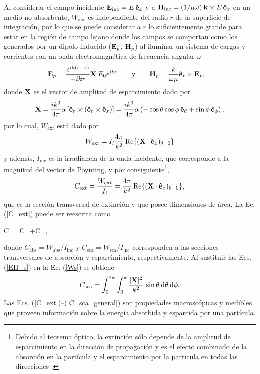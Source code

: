 Al considerar el campo incidente $\vb{E}_{\text{inc}}=E\,\vu{e}_x$ y a $\vb{H}_{\text{inc}}=(1/\mu \omega)\: \vb{k} \times E\, \vu{e}_x$ en un medio no absorbente, $W_{\text{abs}}$ es independiente del radio $r$ de la superficie de integración, por lo que se puede considerar a $r$ lo suficientemente grande para estar en la región de campo lejano donde los campos se comportan como los generados por un dipolo inducido ($\vb{E}_p$, $\vb{H}_p$) al iluminar un sistema de cargas y corrientes con un onda electromagnética de frecuencia angular $\omega$ \cite{bohrenAbsorptionScatteringLight2008}
%
\begin{align}
	\vb{E}_{p}&=\frac{e^{ik(r-z)}}{-ikr}\vb{X}\:E_0 e^{ikz}\qquad\text{y}\qquad
	\vb{H}_{p}=\frac{k}{\omega\mu}\vu{e}_r\times\vb{E}_{p},
	\label{EH_s}
\end{align}
%
donde $\vb{X}$ es el vector de amplitud de esparcimiento dado por
\begin{equation}
	\vb{X}=\frac{ik^3}{4\pi}\alpha \left[ \vu{e}_r\times(\vu{e}_r\times \vu{e}_x)\right]=\frac{ik^3}{4\pi}\alpha \left(-\cos\theta\cos\phi\, \vu{e}_{\theta}+\sin\phi\, \vu{e}_{\phi} \right),
	\label{eq:Xvec}
\end{equation}
%
por lo cual, $W_{\text{ext}}$ está dado por \cite{bohrenAbsorptionScatteringLight2008}
%
\begin{equation*}
	W_{\text{ext}}=I_i\frac{4\pi}{k^2}\:\text{Re}\{(\vb{X}\cdot\vu{e}_x)_{\theta=0}\}
\end{equation*}
%
y además, $I_{\text{inc}}$ es la irradiancia de la onda incidente, que corresponde a la magnitud del vector de Poynting, y por consiguiente\footnote{Debido al teorema óptico, la extinción sólo depende de la amplitud de esparcimiento en la dirección de propagación y es el efecto combinado de la absorción en la partícula y el esparcimiento por la partícula en todas las direcciones \cite{bohrenAbsorptionScatteringLight2008}.},
%
\begin{equation}
	C_{\text{ext}}=\frac{W_{\text{ext}}}{I_i}=\frac{4\pi}{k^2}\:\text{Re}\{(\vb{X}\cdot\vu{e}_x)_{\theta=0}\}, \label{C_ext}
\end{equation}
%
que es la sección transversal de extinción y que posee dimensiones de área. La Ec. (\ref{C_ext}) puede ser reescrita como \cite{bohrenAbsorptionScatteringLight2008}
%
\begin{tcolorbox}
	C_{}=C_{}+C_{},
	\label{C} 
\end{tcolorbox}
%
\noindent donde $C_{\text{abs}}=W_{\text{abs}}/I_{\text{inc}}$ y $C_{\text{sca}}=W_{\text{sca}}/I_{\text{inc}}$ corresponden a las secciones transversales de absorción y esparcimiento, respectivamente. Al sustituir las Ecs. (\ref{EH_s}) en la Ec. (\ref{Ws}) se obtiene
%
\begin{equation}
	C_{\text{sca}}=\int_0^{2\pi}\int_0^{\pi}\frac{|\vb{X}|^2}{k^2}\:\sin\theta\: \text{d}\theta\:\text{d}\phi.
	\label{C_sca_general}
\end{equation}
Las Ecs. (\ref{C_ext})--(\ref{C_sca_general}) son propiedades macroscópicas y medibles que proveen información sobre la energía absorbida y esparcida por una partícula.  \\

